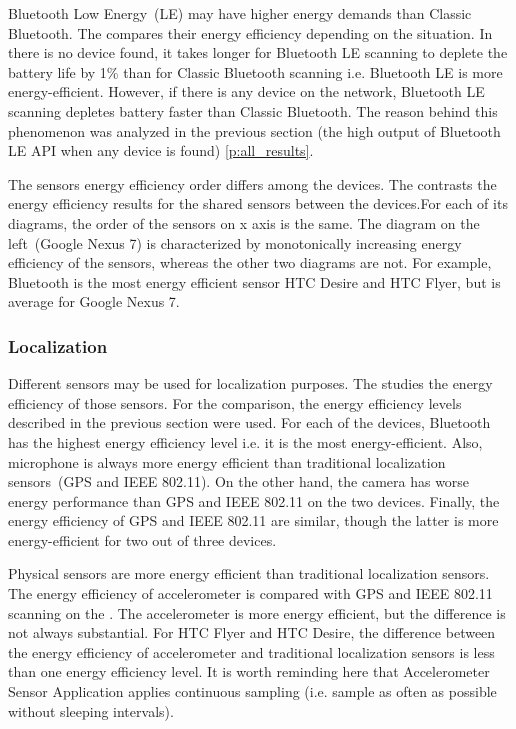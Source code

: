Bluetooth Low Energy\ (LE) may have higher energy demands than Classic Bluetooth. The  compares their energy efficiency depending on the situation. In there is no device found, it takes longer for Bluetooth LE scanning to deplete the battery life by 1\% than for Classic Bluetooth scanning i.e. Bluetooth LE is more energy-efficient. However, if there is any device on the network, Bluetooth LE scanning depletes battery faster than Classic Bluetooth. The reason behind this phenomenon was analyzed in the previous section (the high output of Bluetooth LE API when any device is found) \ref{p:all_results}.
	
				
The sensors energy efficiency order differs among the devices. The  contrasts the energy efficiency results for the shared sensors between the devices.For each of its diagrams, the order of the sensors on x axis is the same. The diagram on the left\ (Google Nexus 7) is characterized by monotonically increasing energy efficiency of the sensors, whereas the other two diagrams are not. For example, Bluetooth is the most energy efficient sensor HTC Desire and HTC Flyer, but is average for Google Nexus 7.

		
\subsubsection{Localization}

\hspace{10pt} Different sensors may be used for localization purposes. The  studies the energy efficiency of those sensors. For the comparison, the energy efficiency levels described in the previous section were used. For each of the devices, Bluetooth has the highest energy efficiency level i.e. it is the most energy-efficient. Also, microphone is always more energy efficient than traditional localization sensors\ (GPS and IEEE 802.11). On the other hand, the camera has worse energy performance than GPS and IEEE 802.11 on the two devices. Finally, the energy efficiency of GPS and IEEE 802.11 are similar, though the latter is more energy-efficient for two out of three devices.  	


Physical sensors are more energy efficient than traditional localization sensors. The energy efficiency of accelerometer is compared with GPS and IEEE 802.11 scanning on the . The accelerometer is more energy efficient, but the difference is not always substantial. For HTC Flyer and HTC Desire, the difference between the energy efficiency of accelerometer and traditional localization sensors is less than one energy efficiency level. It is worth reminding here that Accelerometer Sensor Application applies continuous sampling (i.e. sample as often as possible without sleeping intervals).
	
